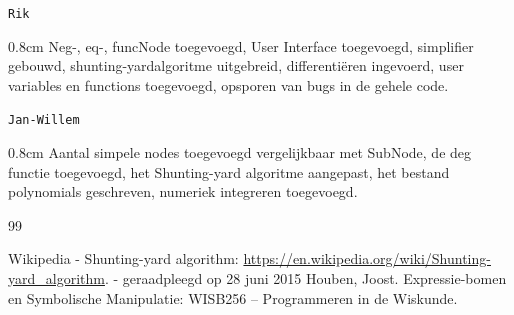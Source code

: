 \documentclass[a4paper]{article}
\newcommand{\com}[2]{\texttt{#1}\mbox{}\vspace{-2ex}\begin{adjustwidth}{0.8cm}{} #2 \end{adjustwidth}}
\begin{document}
\com{Rik} {Neg-, eq-, funcNode toegevoegd, User Interface toegevoegd, simplifier gebouwd, shunting-yardalgoritme uitgebreid, differenti\"eren ingevoerd, user variables en functions toegevoegd, opsporen van bugs in de gehele code.}

\com{Jan-Willem} {Aantal simpele nodes toegevoegd vergelijkbaar met SubNode, de deg functie toegevoegd, het Shunting-yard algoritme aangepast, het bestand polynomials geschreven, numeriek integreren toegevoegd.}

\begin{thebibliography}{99}

 Wikipedia - Shunting-yard algorithm:
\url{https://en.wikipedia.org/wiki/Shunting-yard_algorithm}. 
 - geraadpleegd op 28 juni 2015
  Houben, Joost. Expressie-bomen en Symbolische Manipulatie: WISB256 – Programmeren in de Wiskunde.


\end{thebibliography}
\end{document}
